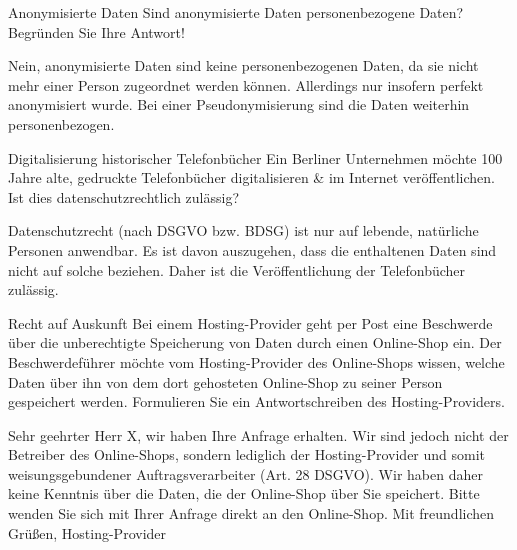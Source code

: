 \documentclass{article}
\begin{document}
\begin{exercise}{Anonymisierte Daten}
  Sind anonymisierte Daten personenbezogene Daten? Begründen Sie Ihre Antwort!

  \begin{solution}
    Nein, anonymisierte Daten sind keine personenbezogenen Daten, da sie nicht mehr einer Person zugeordnet werden können. Allerdings nur insofern perfekt anonymisiert wurde. Bei einer Pseudonymisierung sind die Daten weiterhin personenbezogen.
  \end{solution}
\end{exercise}

\begin{exercise}{Digitalisierung historischer Telefonbücher}
  Ein Berliner Unternehmen möchte 100 Jahre alte, gedruckte Telefonbücher digitalisieren \& im Internet veröffentlichen. Ist dies datenschutzrechtlich zulässig?

  \begin{solution}
    Datenschutzrecht (nach DSGVO bzw. BDSG) ist nur auf lebende, natürliche Personen anwendbar. Es ist davon auszugehen, dass die enthaltenen Daten sind nicht auf solche beziehen. Daher ist die Veröffentlichung der Telefonbücher zulässig.
  \end{solution}
\end{exercise}

\begin{exercise}{Recht auf Auskunft}
  Bei einem Hosting-Provider geht per Post eine Beschwerde über die unberechtigte Speicherung von Daten durch einen Online-Shop ein. Der Beschwerdeführer möchte vom Hosting-Provider des Online-Shops wissen, welche Daten über ihn von dem dort gehosteten Online-Shop zu seiner Person gespeichert werden.\newline
  Formulieren Sie ein Antwortschreiben des Hosting-Providers.

  \begin{solution}
    Sehr geehrter Herr X,\newline
    wir haben Ihre Anfrage erhalten. Wir sind jedoch nicht der Betreiber des Online-Shops, sondern lediglich der Hosting-Provider und somit weisungsgebundener Auftragsverarbeiter (Art. 28 DSGVO). Wir haben daher keine Kenntnis über die Daten, die der Online-Shop über Sie speichert. Bitte wenden Sie sich mit Ihrer Anfrage direkt an den Online-Shop.\newline
    Mit freundlichen Grüßen,\newline
    Hosting-Provider
  \end{solution}
\end{exercise}
\end{document}
